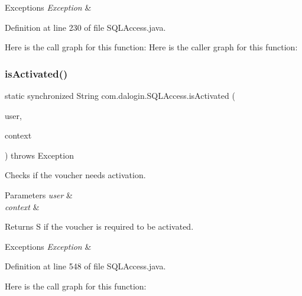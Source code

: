 \begin{DoxyExceptions}{Exceptions}
{\em Exception} & \\
\hline
\end{DoxyExceptions}


Definition at line 230 of file S\+Q\+L\+Access.\+java.

Here is the call graph for this function\+:
Here is the caller graph for this function\+:
\mbox{\label{classcom_1_1dalogin_1_1_s_q_l_access_a1c2a8450e2e4f051017b6b42a7de1b87}} 
\subsubsection{\texorpdfstring{is\+Activated()}{isActivated()}}
{\footnotesize\ttfamily static synchronized String com.\+dalogin.\+S\+Q\+L\+Access.\+is\+Activated (\begin{DoxyParamCaption}\item[{String}]{user,  }\item[{Servlet\+Context}]{context }\end{DoxyParamCaption}) throws Exception\hspace{0.3cm}{\ttfamily [static]}}

Checks if the voucher needs activation.


\begin{DoxyParams}{Parameters}
{\em user} & \\
\hline
{\em context} & \\
\hline
\end{DoxyParams}
\begin{DoxyReturn}{Returns}
{\ttfamily S {\ttfamily  if the voucher is required to be activated. }}
\end{DoxyReturn}

\begin{DoxyExceptions}{Exceptions}
{\em Exception} & {\ttfamily {\ttfamily }}\\
\hline
\end{DoxyExceptions}


Definition at line 548 of file S\+Q\+L\+Access.\+java.

Here is the call graph for this function\+:
\mbox{\label{classcom_1_1dalogin_1_1_s_q_l_access_ac5350ae5f221b5ea02852f6c59fd7124}} 
